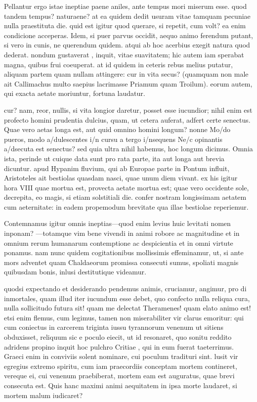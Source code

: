  Pellantur ergo istae ineptiae paene aniles, ante tempus mori miserum esse. quod tandem tempus? naturaene? at ea quidem dedit usuram vitae tamquam pecuniae nulla praestituta die. quid est igitur quod querare, si repetit, cum volt? ea enim condicione acceperas. Idem, si puer parvus occidit, aequo animo ferendum putant, si vero in cunis, ne querendum quidem. atqui ab hoc acerbius exegit natura quod dederat. nondum gustaverat , inquit, vitae suavitatem; hic autem iam sperabat magna, quibus frui coeuperat. at id quidem in ceteris rebus melius putatur, aliquam partem quam nullam attingere: cur in vita secus? (quamquam non male ait Callimachus multo saepius lacrimasse Priamum quam Troilum). eorum autem, qui exacta aetate moriuntur, fortuna laudatur.

 cur? nam, reor, nullis, si vita longior daretur, posset esse iucundior; nihil enim est profecto homini prudentia dulcius, quam, ut cetera auferat, adfert certe senectus. Quae vero aetas longa est, aut quid omnino homini longum? nonne Mo/do pueros, modo a/dulescentes i/n cursu a tergo i/nsequens Ne/c opinantis a/dsecuta est senectus? sed quia ultra nihil habemus, hoc longum dicimus. Omnia ista, perinde ut cuique data sunt pro rata parte, ita aut longa aut brevia dicuntur. apud Hypanim fluvium, qui ab Europae parte in Pontum influit, Aristoteles ait bestiolas quasdam nasci, quae unum diem vivant. ex his igitur hora VIII quae mortua est, provecta aetate mortua est; quae vero occidente sole, decrepita, eo magis, si etiam solstitiali die. confer nostram longissimam aetatem cum aeternitate: in eadem propemodum brevitate qua illae bestiolae reperiemur.

 Contemnamus igitur omnis ineptias—quod enim levius huic levitati nomen inponam? —totamque vim bene vivendi in animi robore ac magnitudine et in omnium rerum humanarum contemptione ac despicientia et in omni virtute ponamus. nam nunc quidem cogitationibus mollissimis effeminamur, ut, si ante mors adventet quam Chaldaeorum promissa consecuti sumus, spoliati magnis quibusdam bonis, inlusi destitutique videamur.

 quodsi expectando et desiderando pendemus animis, cruciamur, angimur, pro di inmortales, quam illud iter iucundum esse debet, quo confecto nulla reliqua cura, nulla sollicitudo futura sit! quam me delectat Theramenes! quam elato animo est! etsi enim flemus, cum legimus, tamen non miserabiliter vir clarus emoritur: qui cum coniectus in carcerem triginta iussu tyrannorum venenum ut sitiens obduxisset, reliquum sic e poculo eiecit, ut id resonaret, quo sonitu reddito adridens propino inquit hoc pulchro Critiae , qui in eum fuerat taeterrimus. Graeci enim in conviviis solent nominare, cui poculum tradituri sint. lusit vir egregius extremo spiritu, cum iam praecordiis conceptam mortem contineret, vereque ei, cui venenum praebiberat, mortem eam est auguratus, quae brevi consecuta est. Quis hanc maximi animi aequitatem in ipsa morte laudaret, si mortem malum iudicaret?

